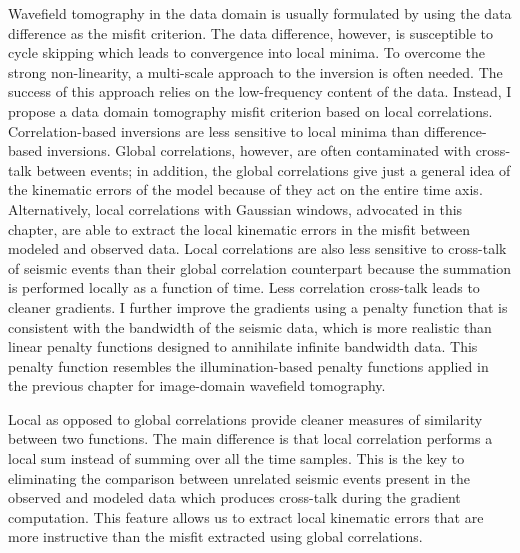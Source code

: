 Wavefield tomography in the data domain is usually formulated by using the
data difference as the misfit criterion. The data difference, however, is 
susceptible to cycle skipping which leads to convergence into local minima. To
overcome the strong non-linearity, a multi-scale approach to the inversion is
often needed. The success of this approach relies on the low-frequency content
of the data. Instead, I propose a data domain tomography misfit criterion
based on local correlations. Correlation-based inversions are less
sensitive to local minima than difference-based inversions. Global correlations,
however, are often contaminated with cross-talk between events; in addition,
the global correlations give just a general idea of the kinematic errors of
the model because of they act on the entire time axis. Alternatively, local
correlations with Gaussian windows, advocated in this chapter, are able to
extract the local kinematic errors in the misfit between modeled and observed
data. Local correlations are also less sensitive to cross-talk of seismic events
than their global correlation counterpart because the summation is performed
locally as a function of time. Less correlation cross-talk leads to 
cleaner gradients. I further improve the gradients
using a penalty function that is consistent with the bandwidth of the seismic
data, which is more realistic than linear penalty functions designed to annihilate
infinite bandwidth data. This penalty function resembles the illumination-based
penalty functions applied in the previous chapter for image-domain wavefield tomography.

Local as opposed to global correlations provide cleaner measures of similarity between two functions.
The main difference is that local correlation performs a local sum instead of summing 
over all the time samples. This is the key to eliminating the comparison between
 unrelated seismic events present in the observed and modeled data which produces cross-talk during 
the gradient computation. This feature 
allows us to extract local kinematic errors that are 
more instructive than the misfit extracted using global correlations.

